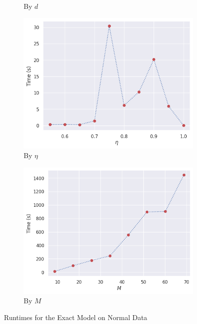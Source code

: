 \documentclass[11pt,twoside]{report}
\theoremstyle{definition}
\numberwithin{theorem}{section}
\numberwithin{definition}{section}
\numberwithin{lemma}{section}
\numberwithin{proposition}{section}
\numberwithin{equation}{section}
\numberwithin{figure}{section}
\begin{document}
\begin{figure}
\begin{subfigure}[b]{0.475\textwidth}
        \caption{By $d$}
        \label{fig:exact_benchmarks_d}
    \end{subfigure}
    \hfill
    \begin{subfigure}[b]{0.475\textwidth}
        \centering
        \includegraphics[width=\textwidth]{exact_benchmarks/func_eta_n300_d10_normal.png}
        \caption{By $\eta$}
        \label{fig:exact_benchmarks_eta}
    \end{subfigure}
    \hfill
    \begin{subfigure}[b]{0.475\textwidth}
        \centering
        \includegraphics[width=\textwidth]{exact_benchmarks/func_M_n300_d10_eta0p9_normal.png}
        \caption{By $M$}
        \label{fig:exact_benchmarks_M}
    \end{subfigure}
    \caption{Runtimes for the Exact Model on Normal Data}
    \label{fig:exact_benchmarks}
\end{figure}
\end{document}
